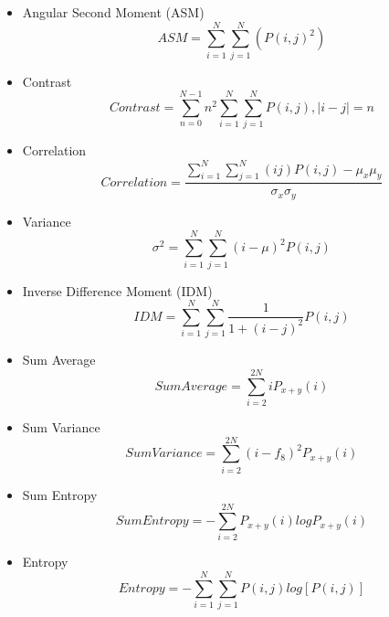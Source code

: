 \documentclass[review]{elsarticle}
\begin{document}
\begin{itemize}
	\item Angular Second Moment (ASM)
	\begin{equation}
	ASM = \sum_{i=1}^N\sum_{j=1}^N (P(i,j)^2)
	\end{equation}	
	
	\item Contrast
	\begin{equation}
	Contrast = \sum_{n=0}^{N -1}n^2{\sum_{i=1}^{N}\sum_{j=1}^{N} P(i,j)}, |i - j| =n
	\end{equation}
	
	
	\item Correlation \\ 
	\begin{equation}
	Correlation = \dfrac{\sum_{i=1}^N\sum_{j=1}^N (ij)P(i,j)-\mu_x \mu_y}{\sigma_x \sigma_y} 
	\end{equation}
	
	\item Variance  
	\begin{equation}
	\sigma^2= \sum_{i=1}^N\sum_{j=1}^N (i - \mu)^2P(i,j)
	\end{equation}
	
	\item Inverse Difference Moment (IDM) 
	\begin{equation}
	IDM=\sum_{i=1}^N\sum_{j=1}^N \dfrac{1}{1+(i-j)^2} P(i,j)
	\end{equation}
	
	
	\item Sum Average 
	\begin{equation}
	Sum Average= \sum_{i=2}^{2N} iP_{x+y}(i) 
	\end{equation}
	
	\item Sum Variance
	\begin{equation}
	Sum Variance = \sum_{i=2}^{2N} (i-f_8)^2P_{x+y}(i) 
	\end{equation}
	
	\item Sum Entropy 
	\begin{equation}
	Sum Entropy= - \sum_{i=2}^{2N} P_{x+y}(i) log{P_{x+y}(i)}
	\end{equation}
	
	\item Entropy 
	\begin{equation}
	Entropy= - \sum_{i=1}^N\sum_{j=1}^N P(i,j) log[P(i,j)]
	\end{equation}
	

\end{itemize}
\end{document}
